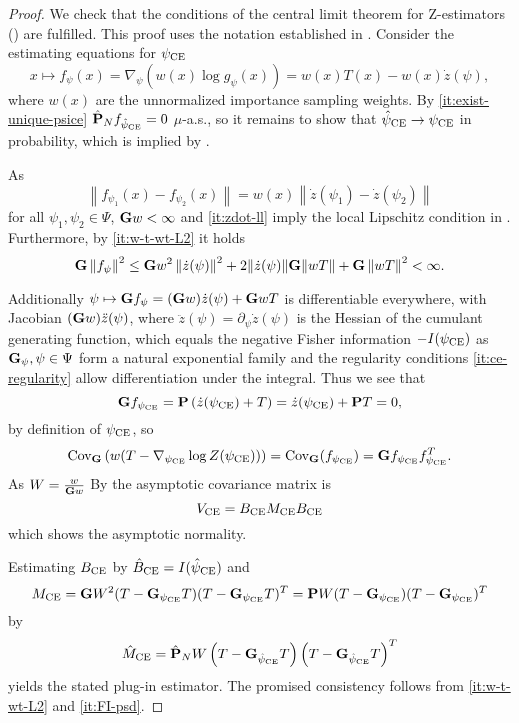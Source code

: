 \begin{proof} We check that the conditions of the central limit theorem for Z-estimators () are fulfilled. This proof uses the notation established in . Consider the estimating equations for ${\psi_{\text{CE}}}$ 
    $$x\mapsto f_\psi(x) = \nabla_{\psi} \left(w(x)\log g_{\psi}(x)\right) = w(x) T(x) - w(x) \dot z (\psi),$$ where $w(x)$ are the unnormalized importance sampling weights. 
    By \ref{it:exist-unique-psice} $\hat {\mathbf P}_{N} f_{{\hat\psi_{\text{CE}}}} = 0$ $\mu$-a.s., so it remains to show that ${\hat\psi_{\text{CE}}} \to {\ensuremath{\psi_{\text{CE}}}}$  in probability, which is implied by .
    
    As $$\left\lVert f_{\psi_1}(x) - f_{\psi_2}(x)\right\rVert = w(x) \left\lVert \dot z (\psi_1) - \dot z(\psi_2)\right\rVert$$ for all $\psi_{1}, \psi_{2}\in \Psi$,  $\mathbf G w < \infty $ and \ref{it:zdot-ll} imply the local Lipschitz condition  in .
    Furthermore, by \ref{it:w-t-wt-L2} it holds
    $$
    \mathbf G \left\lVert f_\psi \right\rVert^2 \leq \mathbf G w^2 \left\lVert \dot z(\psi) \right\rVert ^2  + 2 \lVert \dot z(\psi) \rVert \mathbf G \lVert wT\rVert + \mathbf G \left\lVert wT\right\rVert^2 < \infty.
    $$

    Additionally $\psi \mapsto\mathbf G f_\psi = (\mathbf G w) \dot z (\psi) + \mathbf G wT$ is differentiable everywhere, with Jacobian $(\mathbf G w) \ddot z(\psi)$, where  $\ddot z(\psi) = \partial_\psi \dot z(\psi)$ is the Hessian of the cumulant generating function, which equals the negative Fisher information $-I({\psi_{\text{CE}}})$ as $\mathbf G_{\psi}, \psi \in \Psi$ form a natural exponential family and the regularity conditions \ref{it:ce-regularity} allow differentiation under the integral.
    Thus we see that 
    $$
    \mathbf G f_{{\psi_{\text{CE}}}} = \mathbf P \left( \dot z({\psi_{\text{CE}}}) + T \right) = \dot z ({\psi_{\text{CE}}}) + \mathbf P T = 0,
    $$
    by definition of ${\psi_{\text{CE}}}$, so $$\text{Cov}_{\mathbf G} \left( w(T - \nabla_{{\psi_{\text{CE}}}} \log Z ({\psi_{\text{CE}}})) \right) = \text{Cov}_{\mathbf G}(f_{{\psi_{\text{CE}}}}) = \mathbf G f_{{\psi_{\text{CE}}}}f_{{\psi_{\text{CE}}}}^{T}.$$
    As $W = \frac{w}{\mathbf G w}$
    By  the asymptotic covariance matrix is 
    $$
    V_{{\text{CE}}} = B_{{\text{CE}}}M_{{\text{CE}}}B_{{\text{CE}}}
    $$
    which shows the asymptotic normality. 

    Estimating $B_{{\text{CE}}}$ by $\hat B_{{\text{CE}}}= I({\hat\psi_{\text{CE}}})$ and $$M_{{\text{CE}}} = \mathbf G W^{2} (T - \mathbf G_{{\psi_{\text{CE}}}}T)(T - \mathbf G_{{\psi_{\text{CE}}}}T)^{T} = \mathbf P W (T - \mathbf G_{{\psi_{\text{CE}}}})(T - \mathbf G_{{\psi_{\text{CE}}}})^T$$ by $$\hat M_{{\text{CE}}} = \hat{\mathbf P}_{N} W \left( T - \mathbf G_{{\hat\psi_{\text{CE}}}} T \right)\left( T - \mathbf G_{{\hat\psi_{\text{CE}}}} T \right)^{T}$$
    yields the stated plug-in estimator. 
    The promised consistency follows from \ref{it:w-t-wt-L2} and \ref{it:FI-psd}.
\end{proof}

